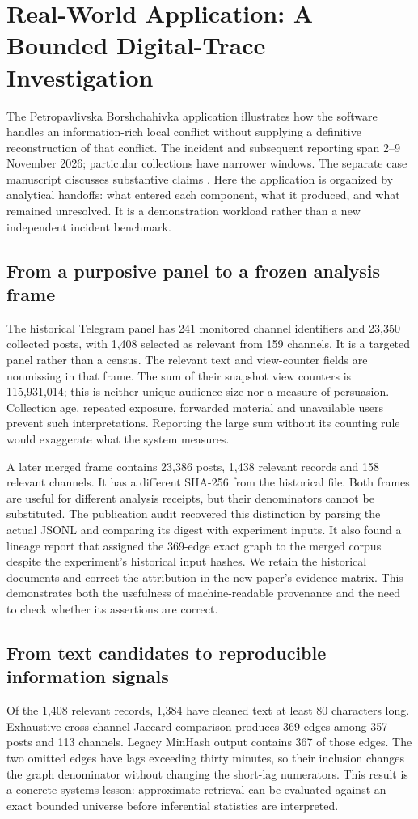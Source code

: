 \section{Real-World Application: A Bounded Digital-Trace Investigation}
\label{sec:application}
The Petropavlivska Borshchahivka application illustrates how the software handles an information-rich local conflict without supplying a definitive reconstruction of that conflict. The incident and subsequent reporting span 2--9 November 2026; particular collections have narrower windows. The separate case manuscript discusses substantive claims \citep{pylypenko2026case}. Here the application is organized by analytical handoffs: what entered each component, what it produced, and what remained unresolved. It is a demonstration workload rather than a new independent incident benchmark.

\subsection{From a purposive panel to a frozen analysis frame}
The historical Telegram panel has 241 monitored channel identifiers and 23,350 collected posts, with 1,408 selected as relevant from 159 channels. It is a targeted panel rather than a census. The relevant text and view-counter fields are nonmissing in that frame. The sum of their snapshot view counters is 115,931,014; this is neither unique audience size nor a measure of persuasion. Collection age, repeated exposure, forwarded material and unavailable users prevent such interpretations. Reporting the large sum without its counting rule would exaggerate what the system measures.

A later merged frame contains 23,386 posts, 1,438 relevant records and 158 relevant channels. It has a different SHA-256 from the historical file. Both frames are useful for different analysis receipts, but their denominators cannot be substituted. The publication audit recovered this distinction by parsing the actual JSONL and comparing its digest with experiment inputs. It also found a lineage report that assigned the 369-edge exact graph to the merged corpus despite the experiment's historical input hashes. We retain the historical documents and correct the attribution in the new paper's evidence matrix. This demonstrates both the usefulness of machine-readable provenance and the need to check whether its assertions are correct.

\subsection{From text candidates to reproducible information signals}
Of the 1,408 relevant records, 1,384 have cleaned text at least 80 characters long. Exhaustive cross-channel Jaccard comparison produces 369 edges among 357 posts and 113 channels. Legacy MinHash output contains 367 of those edges. The two omitted edges have lags exceeding thirty minutes, so their inclusion changes the graph denominator without changing the short-lag numerators. This result is a concrete systems lesson: approximate retrieval can be evaluated against an exact bounded universe before inferential statistics are interpreted.

